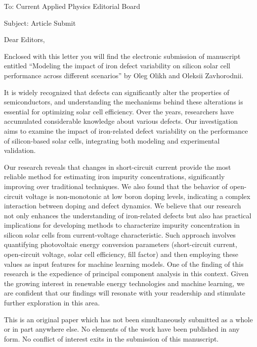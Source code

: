 \documentclass[preprint]{elsarticle}
\begin{document}
To:
Current Applied Physics Editorial Board


Subject:
Article Submit

\vspace{5mm}
Dear Editors,

\vspace{3mm}
Enclosed with this letter you will find the electronic submission of manuscript entitled
``Modeling the impact of iron defect variability on silicon solar cell performance across different scenarios''
by Oleg Olikh and Oleksii Zavhorodnii.

It is widely recognized that defects can significantly alter the properties of semiconductors,
and understanding the mechanisms behind these alterations is essential for optimizing solar cell efficiency.
Over the years, researchers have accumulated considerable knowledge about various defects.
Our investigation aims to examine the impact of iron-related defect variability
on the performance of silicon-based solar cells, integrating both modeling and experimental validation.

Our research reveals that changes in short-circuit current provide the most reliable method for estimating iron impurity concentrations,
significantly improving over traditional techniques.
We also found that the behavior of open-circuit voltage is non-monotonic at low boron doping levels,
indicating a complex interaction between doping and defect dynamics.
We believe that our research not only enhances the understanding of iron-related defects
but also has practical implications for developing methods to characterize impurity concentration in 
silicon solar cells from current-voltage characteristic.
Such approach involves quantifying photovoltaic energy conversion parameters 
(short-circuit current, open-circuit voltage, solar cell efficiency, fill factor) 
and then employing these values as input features for machine learning models. 
One of the finding of this research is the expedience of principal component analysis in this context.
Given the growing interest in renewable energy technologies and machine learning,
we are confident that our findings will resonate with your readership and stimulate further exploration in this area.


This is an original paper which has not been simultaneously submitted as a whole or in part anywhere else.
No elements of the work have been published in any form.
No conflict of interest exits in the submission of this manuscript.
\end{document}
